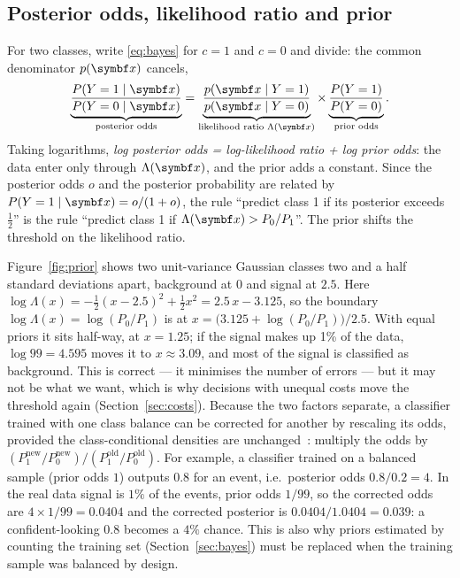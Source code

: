 \documentclass[11pt]{article}
\begin{document}
\subsection{Posterior odds, likelihood ratio and prior}\label{sec:odds}

For two classes, write \eqref{eq:bayes} for $c = 1$ and $c = 0$ and divide: the common denominator $p(\x)$ cancels,
\begin{equation}\label{eq:odds}
  \underbrace{\frac{P(Y = 1 \mid \x)}{P(Y = 0 \mid \x)}}_{\text{posterior odds}}
  = \underbrace{\frac{p(\x \mid Y = 1)}{p(\x \mid Y = 0)}}_{\text{likelihood ratio } \Lambda(\x)}
  \times \underbrace{\frac{P(Y = 1)}{P(Y = 0)}}_{\text{prior odds}} .
\end{equation}
Taking logarithms, \emph{log posterior odds = log-likelihood ratio + log prior odds}: the data enter only through
$\Lambda(\x)$, and the prior adds a constant. Since the posterior odds $o$ and the posterior probability are related by
$P(Y = 1 \mid \x) = o / (1 + o)$, the rule ``predict class 1 if its posterior exceeds $\tfrac12$'' is the rule
``predict class 1 if $\Lambda(\x) > P_0 / P_1$''. The prior shifts the threshold on the likelihood ratio.

Figure~\ref{fig:prior} shows two unit-variance Gaussian classes two and a half standard deviations apart, background at
$0$ and signal at $2.5$. Here $\log \Lambda(x) = -\tfrac12 (x - 2.5)^2 + \tfrac12 x^2 = 2.5\,x - 3.125$, so the
boundary $\log \Lambda(x) = \log(P_0/P_1)$ is at $x = \big(3.125 + \log(P_0/P_1)\big)/2.5$. With equal priors it sits
half-way, at $x = 1.25$; if the signal makes up 1\% of the data, $\log 99 = 4.595$ moves it to $x \approx 3.09$, and
most of the signal is classified as background. This is correct --- it minimises the number of errors --- but it may not
be what we want, which is why decisions with unequal costs move the threshold again (Section~\ref{sec:costs}). Because
the two factors separate, a classifier trained with one class balance can be corrected for another by rescaling its
odds, provided the class-conditional densities are unchanged~\cite{saerens2002}: multiply the odds by
$(P_1^{\mathrm{new}}/P_0^{\mathrm{new}}) / (P_1^{\mathrm{old}}/P_0^{\mathrm{old}})$. For example, a classifier trained
on a balanced sample (prior odds $1$) outputs $0.8$ for an event, i.e.\ posterior odds $0.8/0.2 = 4$. In the real data
signal is $1\%$ of the events, prior odds $1/99$, so the corrected odds are $4 \times 1/99 = 0.0404$ and the corrected
posterior is $0.0404/1.0404 = 0.039$: a confident-looking $0.8$ becomes a $4\%$ chance. This is also why priors
estimated by counting the training set (Section~\ref{sec:bayes}) must be replaced when the training sample was
balanced by design.
\end{document}
